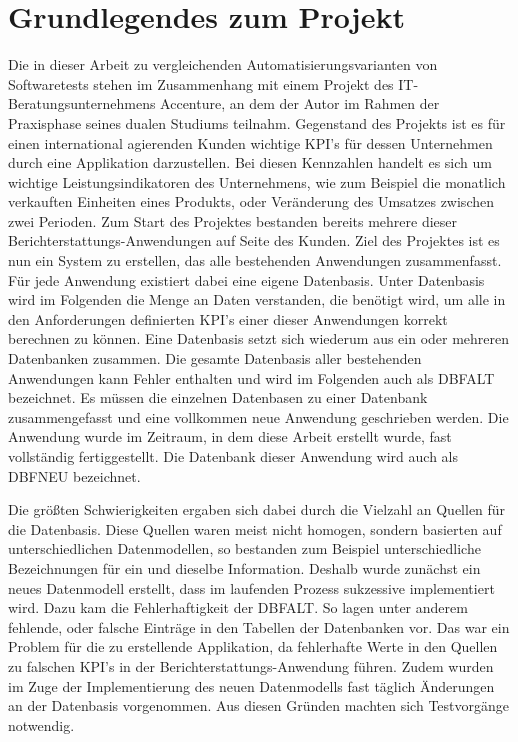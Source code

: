 \chapter{Grundlegendes zum Projekt}
\nocite{*}

Die in dieser Arbeit zu vergleichenden Automatisierungsvarianten von Softwaretests stehen im Zusammenhang mit einem Projekt des IT-Beratungsunternehmens Accenture, an dem der Autor im Rahmen der Praxisphase seines dualen Studiums teilnahm. 
Gegenstand des Projekts ist es für einen international agierenden Kunden wichtige \ac{KPI}'s für dessen Unternehmen durch eine Applikation darzustellen. Bei diesen Kennzahlen handelt es sich um wichtige Leistungsindikatoren des Unternehmens, wie zum Beispiel die monatlich verkauften Einheiten eines Produkts, oder Veränderung des Umsatzes zwischen zwei Perioden.
\newline
Zum Start des Projektes bestanden bereits mehrere dieser Berichterstattungs-Anwendungen auf Seite des Kunden. Ziel des Projektes ist es nun ein System zu erstellen, das alle bestehenden Anwendungen zusammenfasst. Für jede Anwendung existiert dabei eine eigene Datenbasis. Unter Datenbasis wird im Folgenden die Menge an Daten verstanden, die benötigt wird, um alle in den Anforderungen definierten \ac{KPI}'s einer dieser Anwendungen korrekt berechnen zu können. Eine Datenbasis setzt sich wiederum aus ein oder mehreren Datenbanken zusammen. Die gesamte Datenbasis aller bestehenden Anwendungen kann Fehler enthalten und wird im Folgenden auch als \ac{DBFALT} bezeichnet. Es müssen die einzelnen Datenbasen zu einer Datenbank zusammengefasst und eine vollkommen neue Anwendung geschrieben werden.  Die Anwendung wurde im Zeitraum, in dem diese Arbeit erstellt wurde, fast vollständig fertiggestellt. Die Datenbank dieser Anwendung wird auch als \ac{DBFNEU} bezeichnet.
\newline


Die größten Schwierigkeiten ergaben sich dabei durch die Vielzahl an Quellen für die Datenbasis. 
Diese Quellen waren meist nicht homogen, sondern basierten auf unterschiedlichen Datenmodellen, so bestanden zum Beispiel unterschiedliche Bezeichnungen für ein und dieselbe Information. Deshalb wurde zunächst ein neues Datenmodell erstellt, dass im laufenden Prozess sukzessive implementiert wird. 
Dazu kam die Fehlerhaftigkeit der \ac{DBFALT}. So lagen unter anderem fehlende, oder falsche Einträge in den Tabellen der Datenbanken vor.  Das war ein Problem für die zu erstellende Applikation, da fehlerhafte Werte in den Quellen zu falschen \ac{KPI}'s in der Berichterstattungs-Anwendung führen. 
Zudem wurden im Zuge der Implementierung des neuen Datenmodells fast täglich Änderungen an der Datenbasis vorgenommen. Aus diesen Gründen machten sich Testvorgänge notwendig.
